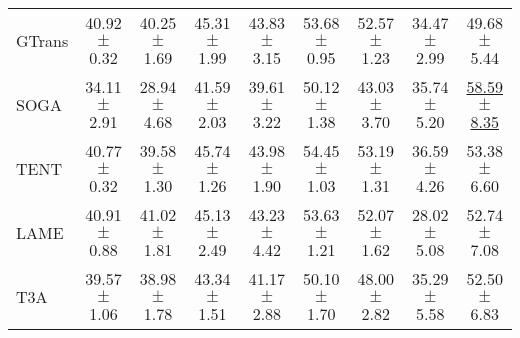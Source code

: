 \begin{table*}[t]
\begin{center}
{\begin{tabular}{lcccccccc}
\\
GTrans &40.92$\pm$0.32 &40.25$\pm$1.69 &45.31$\pm$1.99 &43.83$\pm$3.15 &53.68$\pm$0.95 &52.57$\pm$1.23 
&34.47$\pm$2.99
&49.68$\pm$5.44 
\\
SOGA &34.11$\pm$2.91 &28.94$\pm$4.68 &41.59$\pm$2.03 &39.61$\pm$3.22 &50.12$\pm$1.38 &43.03$\pm$3.70 
&35.74$\pm$5.20 &\underline{58.59$\pm$8.35}
\\
TENT&40.77$\pm$0.32 &39.58$\pm$1.30 &45.74$\pm$1.26 &43.98$\pm$1.90 &54.45$\pm$1.03 &53.19$\pm$1.31 
&36.59$\pm$4.26 &53.38$\pm$6.60 
\\
LAME  &40.91$\pm$0.88 &41.02$\pm$1.81 &45.13$\pm$2.49 &43.23$\pm$4.42 &53.63$\pm$1.21 &52.07$\pm$1.62 
&28.02$\pm$5.08 &52.74$\pm$7.08 
\\
T3A &39.57$\pm$1.06 &38.98$\pm$1.78 &43.34$\pm$1.51 &41.17$\pm$2.88 &50.10$\pm$1.70 &48.00$\pm$2.82 
&35.29$\pm$5.58 &52.50$\pm$6.83 
\\

\end{tabular}}
\end{center}
\end{table*}
